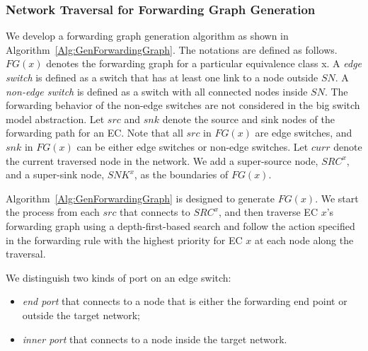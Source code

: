 \subsubsection{Network Traversal for Forwarding Graph Generation}

We develop a forwarding graph generation algorithm as shown in Algorithm~\ref{Alg:GenForwardingGraph}.
The notations are defined as follows.
$FG(x)$ denotes the forwarding graph for a particular equivalence class x.
A \textit{edge switch} is defined as a switch that has at least one link to a node outside $SN$. 
A \textit{non-edge switch} is defined as a switch with all connected nodes inside $SN$.
The forwarding behavior of the non-edge switches are not considered in the big switch model abstraction.
Let $src$ and $snk$ denote the source and sink nodes of the forwarding path for an EC.
Note that all $src$ in $FG(x)$ are edge switches,
and $snk$ in $FG(x)$ can be either edge switches or non-edge switches.
Let $curr$ denote the current traversed node in the network.
We add a super-source node, $SRC^x$, and a super-sink node, $SNK^x$, as the boundaries of $FG(x)$.

Algorithm~\ref{Alg:GenForwardingGraph} is designed to generate $FG(x)$.
We start the process from each $src$ that connects to $SRC^x$,
and then traverse EC $x$'s forwarding graph using a depth-first-based search and
follow the action specified in the forwarding rule with the highest priority for EC $x$ at each node along the traversal.


We distinguish two kinds of port on an edge switch:
\begin{itemize}
\item \textit{end port} that connects to a node that is either the forwarding end point or outside the target network;
\item \textit{inner port} that connects to a node inside the target network.
\end{itemize}

